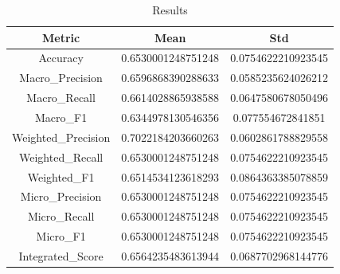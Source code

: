 \begin{table}[htbp]
\centering
\caption{Results}
\label{tab:csv}
\small
\setlength{\tabcolsep}{4pt}
\begin{tabular}{|c|c|c|}
\hline
Metric & Mean & Std \\
\hline
Accuracy & 0.6530001248751248 & 0.0754622210923545 \\
Macro_Precision & 0.6596868390288633 & 0.0585235624026212 \\
Macro_Recall & 0.6614028865938588 & 0.0647580678050496 \\
Macro_F1 & 0.6344978130546356 & 0.077554672841851 \\
Weighted_Precision & 0.7022184203660263 & 0.0602861788829558 \\
Weighted_Recall & 0.6530001248751248 & 0.0754622210923545 \\
Weighted_F1 & 0.6514534123618293 & 0.0864363385078859 \\
Micro_Precision & 0.6530001248751248 & 0.0754622210923545 \\
Micro_Recall & 0.6530001248751248 & 0.0754622210923545 \\
Micro_F1 & 0.6530001248751248 & 0.0754622210923545 \\
Integrated_Score & 0.6564235483613944 & 0.0687702968144776 \\
\hline
\end{tabular}
\end{table}